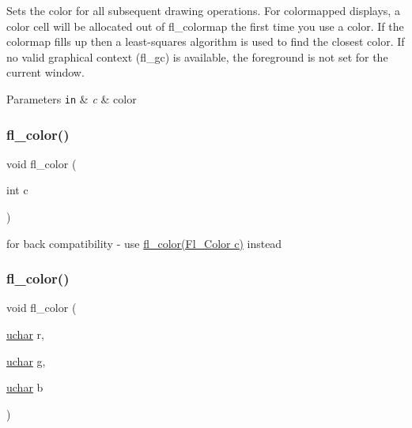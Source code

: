 Sets the color for all subsequent drawing operations. For colormapped displays, a color cell will be allocated out of {\ttfamily fl\+\_\+colormap} the first time you use a color. If the colormap fills up then a least-\/squares algorithm is used to find the closest color. If no valid graphical context (fl\+\_\+gc) is available, the foreground is not set for the current window. 
\begin{DoxyParams}[1]{Parameters}
\mbox{\tt in}  & {\em c} & color \\
\hline
\end{DoxyParams}
\mbox{\label{group__fl__attributes_ga40be3354c55ced3fb119e063cd832716}} 
\subsubsection{\texorpdfstring{fl\+\_\+color()}{fl\_color()}\hspace{0.1cm}{\footnotesize\ttfamily [2/4]}}
{\footnotesize\ttfamily void fl\+\_\+color (\begin{DoxyParamCaption}\item[{int}]{c }\end{DoxyParamCaption})\hspace{0.3cm}{\ttfamily [inline]}}

for back compatibility -\/ use \hyperlink{group__fl__attributes_ga974e9f64959aa83cf6f0a36d3f0105aa}{fl\+\_\+color(\+Fl\+\_\+\+Color c)} instead \mbox{\label{group__fl__attributes_ga208595f1c4e4bd0c32ee5a56194b405c}} 
\subsubsection{\texorpdfstring{fl\+\_\+color()}{fl\_color()}\hspace{0.1cm}{\footnotesize\ttfamily [3/4]}}
{\footnotesize\ttfamily void fl\+\_\+color (\begin{DoxyParamCaption}\item[{\hyperlink{fl__types_8h_a65f85814a8290f9797005d3b28e7e5fc}{uchar}}]{r,  }\item[{\hyperlink{fl__types_8h_a65f85814a8290f9797005d3b28e7e5fc}{uchar}}]{g,  }\item[{\hyperlink{fl__types_8h_a65f85814a8290f9797005d3b28e7e5fc}{uchar}}]{b }\end{DoxyParamCaption})\hspace{0.3cm}{\ttfamily [inline]}}

